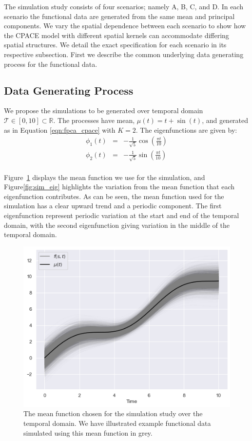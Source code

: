 The simulation study consists of four scenarios; namely A, B, C, and D.
In each scenario the functional data are generated from the same mean and principal components.
We vary the spatial dependence between each scenario to show how the CPACE model with different spatial kernels can accommodate differing spatial structures.
We detail the exact specification for each scenario in its respective subsection.
First we describe the common underlying data generating process for the functional data.

\subsection{Data Generating Process \label{ssec:dgp_sim}}
We propose the simulations to be generated over temporal domain $\mathcal{T} \in \left[0, 10\right] \subset \mathbb{R}$.
The processes have mean, $\mu\left(t\right) = t + \sin\left(t\right)$, and generated as in Equation \eqref{eqn:fpca_cpace} with $K=2$.
The eigenfunctions are given by: 
\begin{eqnarray}
	\phi_1\left(t\right) &=& -\frac{1}{\sqrt{5}}\cos\left(\frac{\pi t}{10}\right) \nonumber \\ 
	\phi_2\left(t\right) &=& -\frac{1}{\sqrt{5}}\sin\left(\frac{\pi t}{10}\right) \nonumber \\
\end{eqnarray}

Figure~\ref{fig:sim_mean} displays the mean function we use for the simulation, and Figure\ref{fig:sim_eig} highlights the variation from the mean function that each eigenfunction contributes.
As can be seen, the mean function used for the simulation has a clear upward trend and a periodic component.
The first eigenfunction represent periodic variation at the start and end of the temporal domain, with the second eigenfunction giving variation in the middle of the temporal domain.

\begin{figure}
	\centering
	\includegraphics[width=\textwidth]{mean_sim}
	\caption{The mean function chosen for the simulation study over the temporal domain. We have illustrated example functional data simulated using this mean function in grey.}
	\label{fig:sim_mean}
\end{figure}

